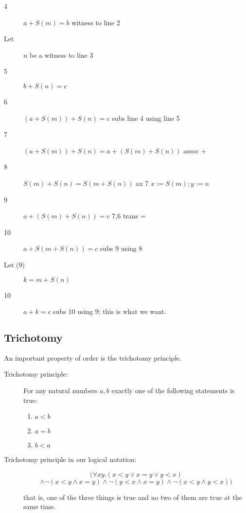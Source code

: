 \documentclass[12pt]{article}
\begin{document}
\begin{description}
\begin{description}
\begin{description}
\item[4] $a+S(m)=b$ witness to line 2

\item[Let] $n$ be a witness to line 3

\item[5] $b+S(n)=c$

\item[6]  $(a+S(m))+S(n)=c$  subs line 4 using line 5

\item[7]  $(a+S(m))+S(n) = a+(S(m)+S(n))$ assoc +

\item[8] $S(m)+S(n) = S(m+S(n))$  ax 7 $x:=S(m);y:=n$

\item[9]  $a+(S(m)+S(n))=c$  7,6 trans =

\item[10]  $a +  S(m+S(n))=c$  subs 9 using 8

\item[Let (9)] $k=m+S(n)$

\item[10] $a+k=c$  subs 10 using 9; this is what we want.

\end{description}

\end{description}

\end{description}

\subsection{Trichotomy}

An important property of order is the trichotomy principle.

\begin{description}

\item[Trichotomy principle:]  For any natural numbers $a,b$ exactly one of the following statements is true:

\begin{enumerate}

\item $a<b$

\item $a=b$

\item $b<a$

\end{enumerate}

\item[Trichotomy principle in our logical notation:]  $$(\forall xy.(x<y \vee x=y \vee y <x)$$ $$\wedge \neg(x<y \wedge x=y) \wedge \neg(y<x \wedge x=y) \wedge \neg(x<y \wedge y<x))$$

that is, one of the three things is true and no two of them are true at the same time.

\end{description}
\end{document}
